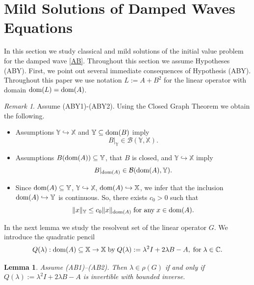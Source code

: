 \documentclass[11pt]{amsart}
\numberwithin{equation}{section}
\newcommand{\CC}{{\mathbb C}}
\newtheorem{lemma}[theorem]{Lemma}
\theoremstyle{remark}
\newtheorem{remark}[theorem]{Remark}
\theoremstyle{definition}
\newcommand\bX{{\mathbb X}}
\newcommand\bY{{\mathbb Y}}
\newcommand{\dom}{\text{\rm{dom}}}
\begin{document}
\section{Mild Solutions of Damped Waves Equations}\label{s3}
In this section we study classical and mild solutions of the  initial value problem for the damped wave \eqref{AB}. 
Throughout this section we assume Hypotheses (ABY). First, we point out several immediate consequences of Hypothesis (ABY). Throughout this paper we use notation $L:=A+B^2$ for the linear operator with domain $\dom(L)=\dom(A)$.
\begin{remark}\label{r3.1} Assume (ABY1)-(ABY2). Using the Closed Graph Theorem we obtain the following.
\begin{itemize}
\item[(i)] Assumptions $\bY \hookrightarrow\bX$ and $\bY \subseteq \dom(B)$ imply 
\begin{equation}\label{r3.1.1}
B|_\bY \in \mathcal{B}(\bY, \bX).
\end{equation}
\item[(ii)] Assumptions $B(\dom(A)) \subseteq\bY$, that $B$ is closed, and $\bY \hookrightarrow \bX$ imply 
\begin{equation}\label{r3.1.2}
B|_{\dom(A)} \in \mathcal{B}(\dom(A), \bY).
\end{equation}\label{r3.1.3}
\item[(iii)] Since $\dom(A) \subseteq \bY$, $\bY \hookrightarrow\bX$, $\dom(A) \hookrightarrow \bX$, we infer that the inclusion $\dom(A)\hookrightarrow\bY$ is continuous. So, there exists $c_0 > 0$
such that 
\begin{equation}\label{r3.1.4}
\|x\|_\bY \leq c_0 \|x\|_{\dom(A)} \;\text{for any}\; x\in\dom(A).
\end{equation}
\end{itemize}
\end{remark}
In the next lemma we study the resolvent set of the linear operator $G$. We introduce the quadratic pencil 
\begin{equation}\label{defQlam}
	Q(\lambda):\dom(A)\subseteq\bX\to\bX\;\mbox{by}\; Q(\lambda) := \lambda^2 I + 2\lambda B - A,\;\mbox{for}\; \lambda\in\CC.
\end{equation}
\begin{lemma}\label{l3.2}
	Assume \textnormal{(AB1)--(AB2)}. Then $\lambda \in \rho(G)$ if and only if
	$Q(\lambda) := \lambda^2 I + 2\lambda B - A$ is invertible with bounded inverse.
\end{lemma}
\end{document}
